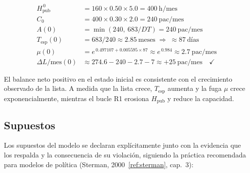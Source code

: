 \documentclass[12pt,a4paper]{article}
\begin{document}
\begin{align*}
  H_{\text{pub}}^{\,0}   & = 160 \times 0.50 \times 5.0 = 400\ \text{h/mes}                                      \\
  C_0                    & = 400 \times 0.30 \times 2.0 = 240\ \text{pac/mes}                                    \\
  A(0)                   & = \min(240,\ 683/DT) = 240\ \text{pac/mes}                                            \\
  T_{\text{esp}}(0)      & = 683 / 240 \approx 2.85\ \text{meses} \;\Rightarrow\; \approx 87\ \text{días}        \\
  \mu(0)                 & = e^{\,0.497107 + 0.005595 \times 87} \approx e^{\,0.984} \approx 2.7\ \text{pac/mes} \\
  \Delta L/\text{mes}(0) & \approx 274.6 - 240 - 2.7 - 7 \approx +25\ \text{pac/mes} \quad \checkmark
\end{align*}

El balance neto positivo en el estado inicial es consistente con el crecimiento observado de la lista. A medida que la lista crece, $T_{\text{esp}}$ aumenta y la fuga $\mu$ crece exponencialmente, mientras el bucle R1 erosiona $H_{\text{pub}}$ y reduce la capacidad.

\subsection{Supuestos}

Los supuestos del modelo se declaran explícitamente junto con la evidencia que los respalda y la consecuencia de su violación, siguiendo la práctica recomendada para modelos de política (Sterman, 2000~\ref{ref:sterman}, cap.~3):
\end{document}
